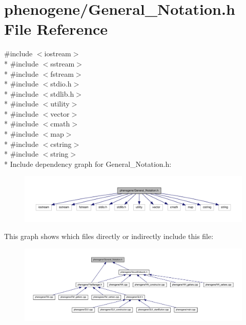 \hypertarget{a00008}{\section{phenogene/\-General\-\_\-\-Notation.h File Reference}
\label{d4/dee/a00008}
}
{\ttfamily \#include $<$iostream$>$}\\*
{\ttfamily \#include $<$sstream$>$}\\*
{\ttfamily \#include $<$fstream$>$}\\*
{\ttfamily \#include $<$stdio.\-h$>$}\\*
{\ttfamily \#include $<$stdlib.\-h$>$}\\*
{\ttfamily \#include $<$utility$>$}\\*
{\ttfamily \#include $<$vector$>$}\\*
{\ttfamily \#include $<$cmath$>$}\\*
{\ttfamily \#include $<$map$>$}\\*
{\ttfamily \#include $<$cstring$>$}\\*
{\ttfamily \#include $<$string$>$}\\*
Include dependency graph for General\-\_\-\-Notation.\-h\-:\nopagebreak
\begin{figure}[H]
\begin{center}
\leavevmode
\includegraphics[width=350pt]{d0/d33/a00027}
\end{center}
\end{figure}
This graph shows which files directly or indirectly include this file\-:\nopagebreak
\begin{figure}[H]
\begin{center}
\leavevmode
\includegraphics[width=350pt]{dc/d3c/a00028}
\end{center}
\end{figure}
